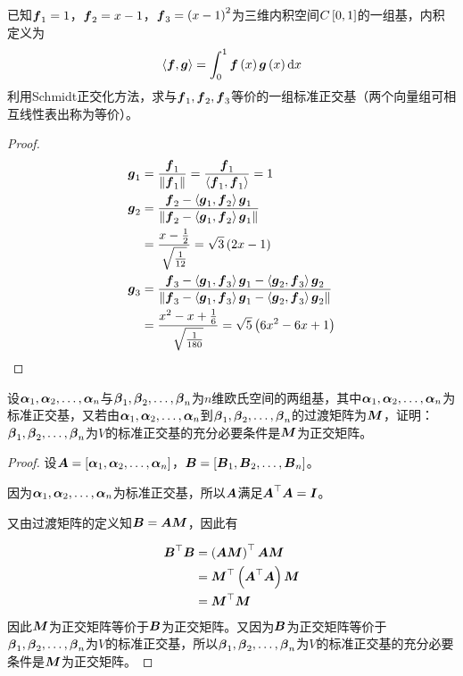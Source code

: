 \begin{problem}
已知\(\vecf_1=1\)，\(\vecf_2=x-1\)，\(\vecf_3=\mypar{x-1}^2\)为三维内积空间\(C\mat{0,1}\)的一组基，内积定义为
\begin{equation*}
    \indot{\vecf}{\vecg}=\int_0^1\vecf\mypar{x}\vecg\mypar{x}\mathrm{d}x
\end{equation*}
利用Schmidt正交化方法，求与\(\vecf_1,\vecf_2,\vecf_3\)等价的一组标准正交基（两个向量组可相互线性表出称为等价）。
\end{problem}
\begin{proof}
    \begin{align*}
        \vecg_1 & =\frac{\vecf_1}{\Abs{\vecf_1}}=\frac{\vecf_1}{\indot{\vecf_1}{\vecf_1}}=1                                                                                      \\
        \vecg_2 & =\frac{\vecf_2-\indot{\vecg_1}{\vecf_2}\vecg_1}{\Abs{\vecf_2-\indot{\vecg_1}{\vecf_2}\vecg_1}}                                                                 \\
                & =\frac{x-\frac{1}{2}}{\sqrt{\frac{1}{12}}}=\sqrt3\mypar{2x-1}                                                                                                  \\
        \vecg_3 & =\frac{\vecf_3-\indot{\vecg_1}{\vecf_3}\vecg_1-\indot{\vecg_2}{\vecf_3}\vecg_2}{\Abs{\vecf_3-\indot{\vecg_1}{\vecf_3}\vecg_1-\indot{\vecg_2}{\vecf_3}\vecg_2}} \\
                & =\frac{x^2-x+\frac{1}{6}}{\sqrt{\frac{1}{180}}}=\sqrt5\mypar{6x^2-6x+1}
    \end{align*}
\end{proof}

\begin{problem}
设\(\enums{\vecal}{n}\)与\(\enums{\vecbeta}{n}\)为\(n\)维欧氏空间的两组基，其中\(\enums{\vecal}{n}\)为标准正交基，又若由\(\enums{\vecal}{n}\)到\(\enums{\vecbeta}{n}\)的过渡矩阵为\(\matm\)，证明：\(\enums{\vecbeta}{n}\)为\(V\)的标准正交基的充分必要条件是\(\matm\)为正交矩阵。
\end{problem}
\begin{proof}
    设\(\mata=\mat{\enums{\vecal}{n}}\)，\(\matb=\mat{\enums{\matb}{n}}\)。

    因为\(\enums{\vecal}{n}\)为标准正交基，所以\(\mata\)满足\(\mata^\top\mata=\mati\)。

    又由过渡矩阵的定义知\(\matb=\mata\matm\)，因此有

    \begin{align*}
        \matb^\top\matb & =\mypar{\mata\matm}^\top\mata\matm      \\
                        & =\matm^\top\mypar{\mata^\top\mata}\matm \\
                        & =\matm^\top\matm
    \end{align*}
    因此\(\matm\)为正交矩阵等价于\(\matb\)为正交矩阵。又因为\(\matb\)为正交矩阵等价于\(\enums{\vecbeta}{n}\)为\(V\)的标准正交基，所以\(\enums{\vecbeta}{n}\)为\(V\)的标准正交基的充分必要条件是\(\matm\)为正交矩阵。
\end{proof}

